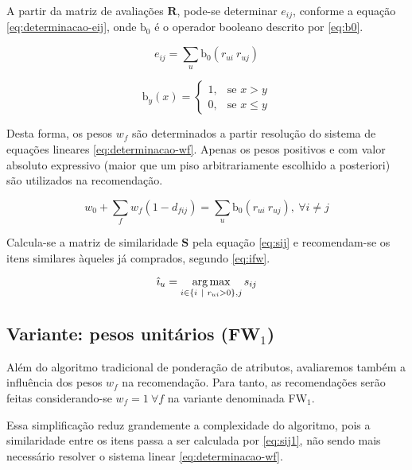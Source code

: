 A partir da matriz de avaliações $\mathbf{R}$, pode-se determinar $e_{ij}$, conforme a equação \ref{eq:determinacao-eij}, onde $\mathrm{b_0}$ é o operador booleano descrito por \ref{eq:b0}.

\begin{equation}
\label{eq:determinacao-eij} 
    e_{ij} = \sum_{u}{\mathrm{b_0}\left(r_{ui} ~ r_{uj}\right)}
\end{equation} 

\begin{equation}
\label{eq:b0}
\mathrm{b}_y\left(x\right) = 
\begin{cases}
1, &\text{se }x>y \\
0, &\text{se }x\leq y
\end{cases} 
\end{equation}

Desta forma, os pesos $w_f$ são determinados a partir resolução do sistema de equações lineares \ref{eq:determinacao-wf}. Apenas os pesos positivos e com valor absoluto expressivo (maior que um piso arbitrariamente escolhido a posteriori) são utilizados na recomendação. 

\begin{equation}
\label{eq:determinacao-wf} 
    w_0 + \sum_{f}{w_{f}  \left(1-d_{fij}\right)} = \sum_{u}{\mathrm{b_0}\left(r_{ui} ~ r_{uj}\right)},~\forall i \neq j 
\end{equation} 

Calcula-se a matriz de similaridade $\mathbf{S}$ pela equação \ref{eq:sij} e recomendam-se os itens similares àqueles já comprados, segundo \ref{eq:ifw}.

\begin{equation}
\label{eq:ifw} 
    \hat{\imath}_u = \operatorname*{arg\,max}_{i \in \left\{i~|~r_{ui} > 0\right\}, j}{s_{ij}}
\end{equation} 

\subsection{Variante: pesos unitários (FW$_1$)} %
\label{sub:variante_pesos_unit_rios}

Além do algoritmo tradicional de ponderação de atributos, avaliaremos também a influência dos pesos $w_f$ na recomendação. Para tanto, as recomendações serão feitas considerando-se $w_f = 1~\forall f$ na variante denominada FW$_1$. 

Essa simplificação reduz grandemente a complexidade do algoritmo, pois a similaridade entre os itens passa a ser calculada por \ref{eq:sij1}, não sendo mais necessário  resolver o sistema linear \ref{eq:determinacao-wf}. 

